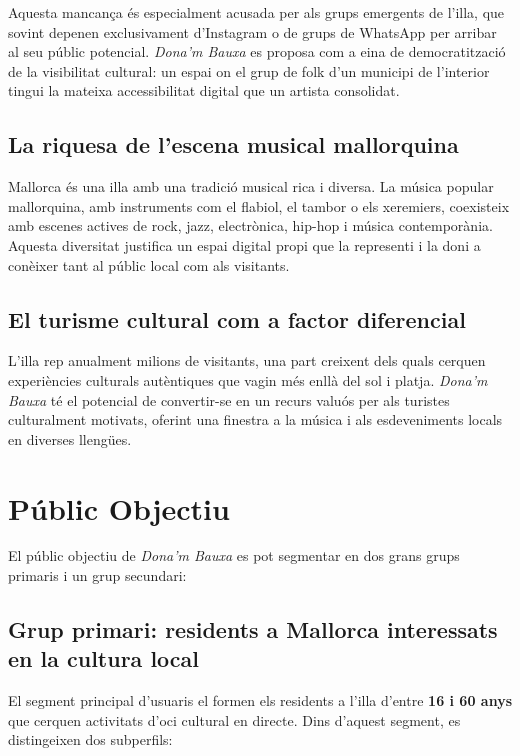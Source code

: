 Aquesta mancança és especialment acusada per als grups emergents de l'illa, que sovint depenen exclusivament d'Instagram o de grups de WhatsApp per arribar al seu públic potencial. \textit{Dona'm Bauxa} es proposa com a eina de democratització de la visibilitat cultural: un espai on el grup de folk d'un municipi de l'interior tingui la mateixa accessibilitat digital que un artista consolidat.

\subsection{La riquesa de l'escena musical mallorquina}

Mallorca és una illa amb una tradició musical rica i diversa. La música popular mallorquina, amb instruments com el flabiol, el tambor o els xeremiers, coexisteix amb escenes actives de rock, jazz, electrònica, hip-hop i música contemporània. Aquesta diversitat justifica un espai digital propi que la representi i la doni a conèixer tant al públic local com als visitants.

\subsection{El turisme cultural com a factor diferencial}

L'illa rep anualment milions de visitants, una part creixent dels quals cerquen experiències culturals autèntiques que vagin més enllà del sol i platja. \textit{Dona'm Bauxa} té el potencial de convertir-se en un recurs valuós per als turistes culturalment motivats, oferint una finestra a la música i als esdeveniments locals en diverses llengües.

\section{Públic Objectiu}

El públic objectiu de \textit{Dona'm Bauxa} es pot segmentar en dos grans grups primaris i un grup secundari:

\subsection{Grup primari: residents a Mallorca interessats en la cultura local}

El segment principal d'usuaris el formen els residents a l'illa d'entre \textbf{16 i 60 anys} que cerquen activitats d'oci cultural en directe. Dins d'aquest segment, es distingeixen dos subperfils:

